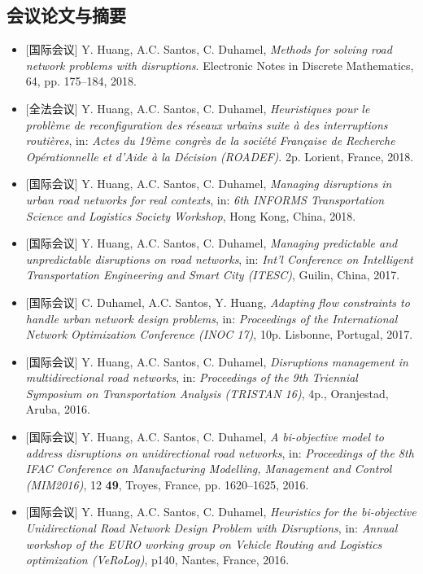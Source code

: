 \documentclass[letterpaper]{twentysecondcv} %
\begin{document}
\subsection{会议论文与摘要}
\begin{itemize}
    \item $[$国际会议$]$ Y. Huang, A.C. Santos, C. Duhamel, \textit{Methods for solving road network problems with disruptions}. Electronic Notes in Discrete Mathematics, 64, pp. 175--184, 2018.
    \item $[$全法会议$]$ Y. Huang, A.C. Santos, C. Duhamel, \textit{Heuristiques pour le problème de reconfiguration des réseaux urbains suite à des interruptions routières}, in: \textit{Actes du 19ème congrès de la société Française de Recherche Opérationnelle et d'Aide à la Décision (ROADEF)}. 2p. Lorient, France, 2018.
    \item $[$国际会议$]$ Y. Huang, A.C. Santos, C. Duhamel, \textit{Managing disruptions in urban road networks for real contexts}, in: \textit{6th INFORMS Transportation Science and Logistics Society Workshop}, Hong Kong, China, 2018.
    \item $[$国际会议$]$ Y. Huang, A.C. Santos, C. Duhamel, \textit{Managing predictable and unpredictable disruptions on road networks}, in: \textit{Int'l Conference on Intelligent Transportation Engineering and Smart City (ITESC)}, Guilin, China, 2017.
    \item $[$国际会议$]$ C. Duhamel, A.C. Santos, Y. Huang, \textit{Adapting flow constraints to handle urban network design problems}, in: \textit{Proceedings of the International Network Optimization Conference (INOC 17)}, 10p. Lisbonne, Portugal, 2017.
    \item $[$国际会议$]$ Y. Huang, A.C. Santos, C. Duhamel, \textit{Disruptions management in multidirectional road networks}, in: \textit{Proceedings of the 9th Triennial Symposium on Transportation Analysis (TRISTAN 16)}, 4p., Oranjestad, Aruba, 2016.
    \item $[$国际会议$]$ Y. Huang, A.C. Santos, C. Duhamel, \textit{A bi-objective model to address disruptions on unidirectional road networks}, in: \textit{Proceedings of the 8th IFAC Conference on Manufacturing Modelling, Management and Control (MIM2016)}, 12 \textbf{49}, Troyes, France, pp. 1620--1625, 2016.
    \item $[$国际会议$]$ Y. Huang, A.C. Santos, C. Duhamel, \textit{Heuristics for the bi-objective Unidirectional Road Network Design Problem with Disruptions}, in: \textit{Annual workshop of the EURO working group on Vehicle Routing and Logistics optimization (VeRoLog)}, p140, Nantes, France, 2016.
\end{itemize}
\end{document}
